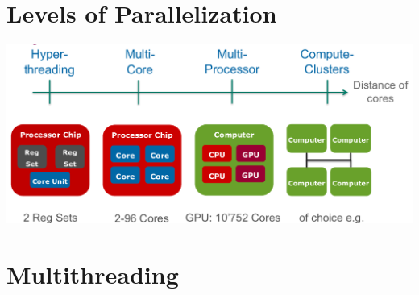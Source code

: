 \section{Levels of Parallelization}

\includegraphics[width=0.7\linewidth]{res/01-levels-of-parallelism.png}

\section{Multithreading}

